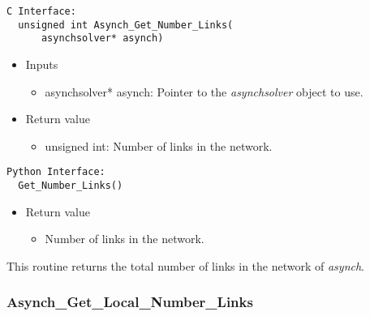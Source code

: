\documentclass[12pt]{article}
\begin{document}
\begin{lstlisting}[style=CStyle]
  C Interface:
  unsigned int Asynch_Get_Number_Links(
      asynchsolver* asynch)
\end{lstlisting}
\begin{itemize}
 \item Inputs
  \begin{itemize}
   \item asynchsolver* asynch: Pointer to the \emph{asynchsolver} object to use.
  \end{itemize}
 \item Return value
  \begin{itemize}
   \item unsigned int: Number of links in the network.
  \end{itemize}
\end{itemize}
\begin{lstlisting}[style=PythonStyle]
  Python Interface:
  Get_Number_Links()
\end{lstlisting}
\begin{itemize}
 \item Return value
  \begin{itemize}
   \item Number of links in the network.
  \end{itemize}
\end{itemize}
This routine returns the total number of links in the network of \emph{asynch}.


\subsubsection{Asynch\_Get\_Local\_Number\_Links} \label{sec: asynch_get_local_number_links}
\end{document}
